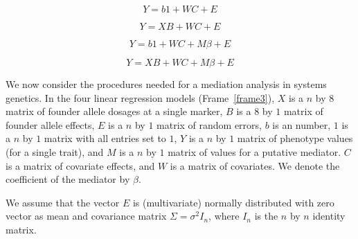\documentclass[oneside]{book}\usepackage[]{graphicx}\usepackage[]{color}
\newenvironment{frameenv}[1]
    {\begin{myfloat}[tb]
    \begin{mdframed}[roundcorner=10pt,backgroundcolor=blue!10]
    \caption{#1}
    }
    {%
    \end{mdframed}\end{myfloat}
    }
\begin{document}
\begin{frameenv}{Four regressions for a single mediation analysis}\label{frame3}


\begin{equation}
Y = b1 + WC + E
\label{model1}
\end{equation}

\begin{equation}
Y = XB + WC + E
\label{model2}
\end{equation}

\begin{equation}
Y = b1 + WC + M\beta + E
\label{model3}
\end{equation}

\begin{equation}
Y = XB + WC + M\beta + E
\label{model4}
\end{equation}
\end{frameenv}

We now consider the procedures needed for a mediation analysis in systems genetics.
In the four linear regression models (Frame~\ref{frame3}), $X$ is a $n$ by $8$ matrix of 
founder allele dosages at a single marker, $B$ is a $8$ by $1$ matrix of founder allele 
effects, $E$ is a $n$ by $1$ matrix of random errors, $b$ is an number, $1$ is 
a $n$ by $1$ matrix with all entries set to $1$, $Y$ is a $n$ by $1$ matrix of 
phenotype values (for a single trait), and $M$ is a $n$ by $1$ matrix of values for a putative mediator. 
$C$ is a matrix of covariate effects, and $W$ is a matrix of covariates. 
We denote the coefficient of the mediator by $\beta$.

We assume that the vector $E$ is (multivariate) normally distributed with zero vector as mean and covariance matrix $\Sigma = \sigma^2I_n$, where $I_n$ is the $n$ by $n$ identity matrix.
\end{document}
